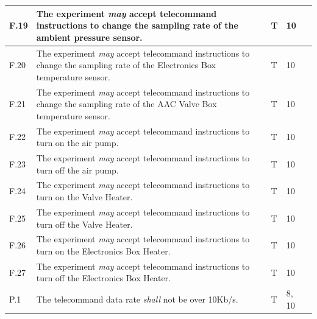 \documentclass[a4paper,12pt,twoside]{article}
\begin{document}
\begin{longtable}[]{|m{}| m{} |m{} |m{}|m{}|}
F.19 & The experiment \textit{may} accept telecommand instructions to change the sampling rate of the ambient pressure sensor.                                                          &     T         & 10            &        \\ \hline
F.20 & The experiment \textit{may} accept telecommand instructions to change the sampling rate of the Electronics Box temperature sensor.                                                       &      T        & 10            &        \\ \hline
F.21 & The experiment \textit{may} accept telecommand instructions to change the sampling rate of the AAC Valve Box temperature sensor.                                                 &      T        & 10            &        \\ \hline
F.22 & The experiment \textit{may} accept telecommand instructions to turn on the air pump.                                                                                             &      T        & 10            &        \\ \hline
F.23 & The experiment \textit{may} accept telecommand instructions to turn off the air pump.                                                                                            &       T       & 10            &        \\ \hline
F.24 & The experiment \textit{may} accept telecommand instructions to turn on the Valve Heater.                                                                                         &      T        & 10            &        \\ \hline
F.25 & The experiment \textit{may} accept telecommand instructions to turn off the Valve Heater.                                                                                        &      T        & 10            &        \\ \hline
F.26 & The experiment \textit{may} accept telecommand instructions to turn on the Electronics Box Heater.                                                                                    &      T        & 10            &        \\ \hline
F.27 & The experiment \textit{may} accept telecommand instructions to turn off the Electronics Box Heater.                                                                                   &      T        & 10            &        \\ \hline
P.1  & The telecommand data rate \textit{shall} not be over 10Kb/s.                                                                                                                          &        T      & 8, 10            &        \\ \hline

\end{longtable}
\end{document}
